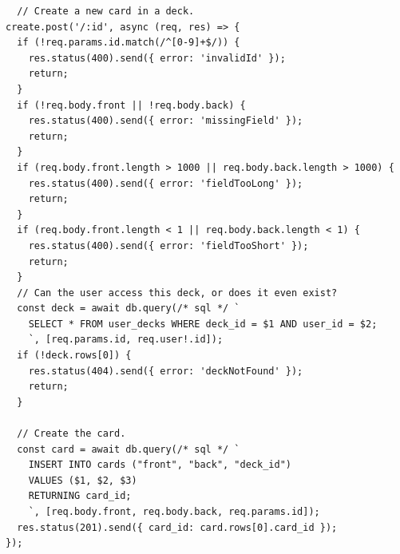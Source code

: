 \documentclass{report}
\begin{document}
\begin{verbatim}
  // Create a new card in a deck.
create.post('/:id', async (req, res) => {
  if (!req.params.id.match(/^[0-9]+$/)) {
    res.status(400).send({ error: 'invalidId' });
    return;
  }
  if (!req.body.front || !req.body.back) {
    res.status(400).send({ error: 'missingField' });
    return;
  }
  if (req.body.front.length > 1000 || req.body.back.length > 1000) {
    res.status(400).send({ error: 'fieldTooLong' });
    return;
  }
  if (req.body.front.length < 1 || req.body.back.length < 1) {
    res.status(400).send({ error: 'fieldTooShort' });
    return;
  }
  // Can the user access this deck, or does it even exist?
  const deck = await db.query(/* sql */ `
    SELECT * FROM user_decks WHERE deck_id = $1 AND user_id = $2;
    `, [req.params.id, req.user!.id]);
  if (!deck.rows[0]) {
    res.status(404).send({ error: 'deckNotFound' });
    return;
  }

  // Create the card.
  const card = await db.query(/* sql */ `
    INSERT INTO cards ("front", "back", "deck_id")
    VALUES ($1, $2, $3)
    RETURNING card_id;
    `, [req.body.front, req.body.back, req.params.id]);
  res.status(201).send({ card_id: card.rows[0].card_id });
});
\end{verbatim}
\end{document}
